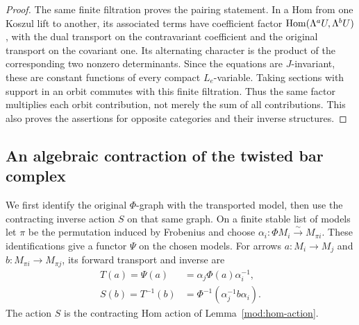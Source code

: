 \begin{proof}
The same finite filtration proves the pairing statement.  In a Hom
from one Koszul lift to another, its associated terms have coefficient
factor $\operatorname{Hom}(\Lambda^aU,\Lambda^bU)$, with the dual transport on the
contravariant coefficient and the original transport on the covariant
one.  Its alternating character is the product of the corresponding
two nonzero determinants.  Since the equations are $J$-invariant,
these are constant functions of every compact $L_e$-variable.
Taking sections with support in an orbit commutes with this finite
filtration.  Thus the same factor multiplies each orbit contribution,
not merely the sum of all contributions.  This also proves the
assertions for opposite categories and their inverse structures.
\end{proof}

\subsection{An algebraic contraction of the twisted bar complex}

We first identify the original $\Phi$-graph with the transported model,
then use the contracting inverse action $S$ on that same graph.
On a finite stable list of models let $\pi$
be the permutation induced by Frobenius and choose
$\alpha_i:\Phi M_i\xrightarrow{\sim}M_{\pi i}$.
These identifications give a functor $\Psi$ on the chosen models.
For arrows $a:M_i\to M_j$ and $b:M_{\pi i}\to M_{\pi j}$,
its forward transport and inverse are
\begin{equation}\label{tr:forward-inverse}
 \begin{split}
 T(a)=\Psi(a)&=\alpha_j\Phi(a)\alpha_i^{-1},\\
 S(b)=T^{-1}(b)&=\Phi^{-1}(\alpha_j^{-1}b\alpha_i).
 \end{split}
\end{equation}
The action $S$ is the contracting Hom action of
Lemma~\ref{mod:hom-action}.

